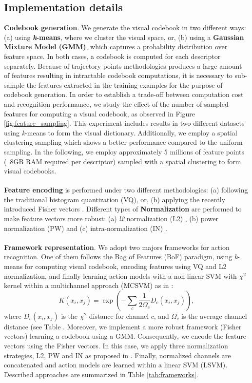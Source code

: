 \subsection{Implementation details}

\textbf{Codebook generation}. We generate the visual codebook in two different ways: (a) using \textbf{\textit{k}-means}, where we cluster the visual space, or, (b) using a \textbf{Gaussian Mixture Model (GMM)}, which captures a probability distribution over feature space. In both cases, a codebook is computed for each descriptor separately. Because of trajectory points methodologies produces a large amount of features resulting in intractable codebook computations, it is necessary to sub-sample the features extracted in the training examples for the purpose of codebook generation. In order to establish a trade-off between computation cost and recognition performance, we study the effect of the number of sampled features for computing a visual codebook, as observed in Figure \ref{fig:feature_sampling}. This experiment includes results in two different datasets using \textit{k}-means to form the visual dictionary. Additionally, we employ a spatial clustering sampling  which shows a better performance compared to the uniform sampling. In the following, we employ approximately 5 millions of feature points (~8GB RAM required per descriptor) sampled with a spatial clustering to form visual codebooks.\\\\
\textbf{Feature encoding} is performed under two different methodologies: (a) following the traditional histogram quantization (VQ), or, (b) applying the recently introduced Fisher vectors \cite{perronnin2010}. Different types of \textbf{Normalization} are performed to make feature vectors more robust: (a) \textit{l2} normalization (L2) \cite{perronnin2010}, (b) power normalization (PW) \cite{perronnin2010} and (c) intra-normalization (IN) \cite{xwang2013}. \\\\
\textbf{Framework representation}. We adopt two majors frameworks for action recognition. One of them follows the Bag of Features (BoF) paradigm, using \textit{k}-means for computing visual codebook, encoding features using VQ and L2 normalization, and finally learning action models with a non-linear SVM with $\chi^2$ kernel within a multichannel approach (MCSVM) as in \cite{zhang2007}:
\begin{equation}
K(x_i,x_j)= \exp(-\sum_c {\frac{1}{2\Omega_c} D_c(x_i,x_j)}),
\label{eq:multichannel}
\end{equation}
where $D_c(x_i,x_j)$ is the $\chi^2$ distance for channel $c$, and $\Omega_c$ is the average channel distance (see Table . Moreover, we implement a more robust framework (Fisher vectors) learning a codebook using a GMM. Consequently, we encode the feature vectors using the Fisher vectors. In this case, we apply three normalization strategies, L2, PW and IN as proposed in \cite{xwang2013}. Finally, normalized channels are concatenated and action models are learned within a linear SVM (LSVM). Described approaches are summarized in Table \ref{tab:frameworks}.


